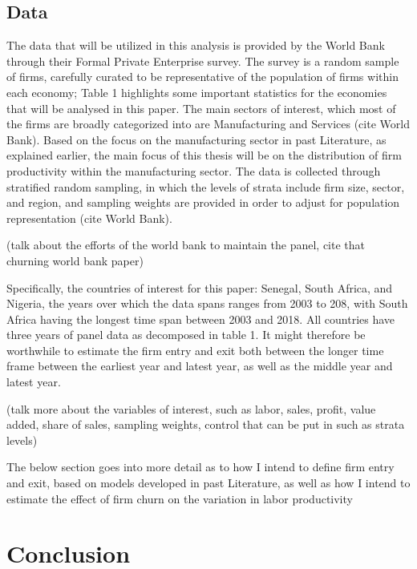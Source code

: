 \documentclass[
  12pt,
  letterpaper,
  DIV=11,
  numbers=noendperiod]{scrartcl}
\newlength{\cslhangindent}
\newlength{\cslentryspacingunit} %
\newenvironment{CSLReferences}[2] %
 {%
  \setlength{\parindent}{0pt}
  \ifodd #1
  \let\oldpar\par
  \def\par{\hangindent=\cslhangindent\oldpar}
  \fi
  \setlength{\parskip}{#2\cslentryspacingunit}
 }%
 {}
\begin{document}
\hypertarget{data}{%
\subsection{Data}\label{data}}

The data that will be utilized in this analysis is provided by the World
Bank through their Formal Private Enterprise survey. The survey is a
random sample of firms, carefully curated to be representative of the
population of firms within each economy; Table 1 highlights some
important statistics for the economies that will be analysed in this
paper. The main sectors of interest, which most of the firms are broadly
categorized into are Manufacturing and Services (cite World Bank). Based
on the focus on the manufacturing sector in past Literature, as
explained earlier, the main focus of this thesis will be on the
distribution of firm productivity within the manufacturing sector. The
data is collected through stratified random sampling, in which the
levels of strata include firm size, sector, and region, and sampling
weights are provided in order to adjust for population representation
(cite World Bank).

(talk about the efforts of the world bank to maintain the panel, cite
that churning world bank paper)

Specifically, the countries of interest for this paper: Senegal, South
Africa, and Nigeria, the years over which the data spans ranges from
2003 to 208, with South Africa having the longest time span between 2003
and 2018. All countries have three years of panel data as decomposed in
table 1. It might therefore be worthwhile to estimate the firm entry and
exit both between the longer time frame between the earliest year and
latest year, as well as the middle year and latest year.

(talk more about the variables of interest, such as labor, sales,
profit, value added, share of sales, sampling weights, control that can
be put in such as strata levels)

The below section goes into more detail as to how I intend to define
firm entry and exit, based on models developed in past Literature, as
well as how I intend to estimate the effect of firm churn on the
variation in labor productivity

\hypertarget{conclusion}{%
\section{Conclusion}\label{conclusion}}

\newpage{}

\hypertarget{refs}{}
\begin{CSLReferences}{0}{0}
\end{CSLReferences}
\end{document}
